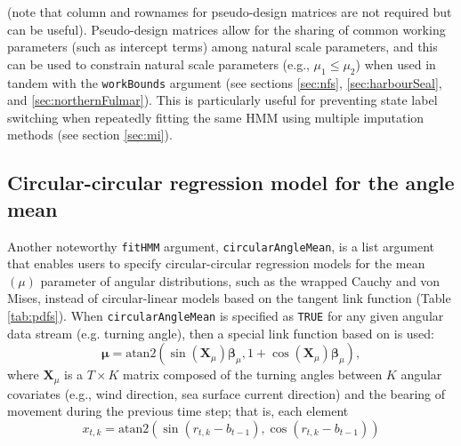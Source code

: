 \documentclass[12pt]{article}\usepackage[]{graphicx}\usepackage[]{color}
\begin{document}
\noindent (note that column and rownames for pseudo-design matrices are not required but can be useful). Pseudo-design matrices allow for the sharing of common working parameters (such as intercept terms) among natural scale parameters, and this can be used to constrain natural scale parameters (e.g., $\mu_1 \le \mu_2$) when used in tandem with the \verb|workBounds| argument (see sections \ref{sec:nfs}, \ref{sec:harbourSeal}, and \ref{sec:northernFulmar}).  This is particularly useful for preventing state label switching when repeatedly fitting the same HMM using multiple imputation methods (see section \ref{sec:mi}).

\subsection{Circular-circular regression model for the angle mean}
\label{sec:circ}
Another noteworthy \verb|fitHMM| argument, \verb|circularAngleMean|, is a list argument that enables users to specify circular-circular regression models for the mean $(\mu)$ parameter of angular distributions, such as the wrapped Cauchy and von Mises, instead of circular-linear models based on the tangent link function (Table \ref{tab:pdfs}). When \verb|circularAngleMean| is specified as \verb|TRUE| for any given angular data stream (e.g. turning angle), then a special link function based on \cite{RivestEtAl2016} is used:
\begin{equation}
  {\boldsymbol \mu}=\text{atan2}(\sin({\mathbf X}_\mu){\boldsymbol \beta}_\mu,1+\cos({\mathbf X}_\mu){\boldsymbol \beta}_\mu),
  \label{eq:circ}
\end{equation}
where ${\mathbf X}_\mu$ is a $T \times K$ matrix composed of the turning angles between $K$ angular covariates (e.g., wind direction, sea surface current direction) and the bearing of movement during the previous time step; that is, each element 
\begin{equation}
x_{t,k}=\text{atan2}(\sin(r_{t,k}-b_{t-1}),\cos(r_{t,k}-b_{t-1})) 
  \label{eq:angleCov}
\end{equation}
\end{document}
